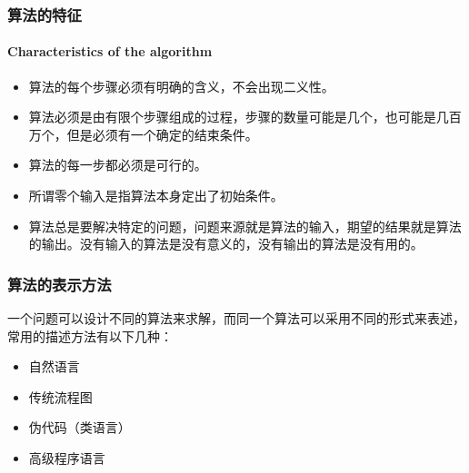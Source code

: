 \documentclass[dvipsnames, svgnames, x11names]{beamer}
\begin{document}
\begin{frame}
    \frametitle{算法的特征}
    \framesubtitle{Characteristics of the algorithm}
    \begin{itemize}
      \item {}
        
      算法的每个步骤必须有明确的含义，不会出现二义性。
      
      \item {}
      
      算法必须是由有限个步骤组成的过程，步骤的数量可能是几个，也可能是几百万个，但是必须有一个确定的结束条件。
      \item {}
      
      算法的每一步都必须是可行的。
      
      \item {}
      
      所谓零个输入是指算法本身定出了初始条件。
      
      \item {}
      
      算法总是要解决特定的问题，问题来源就是算法的输入，期望的结果就是算法的输出。没有输入的算法是没有意义的，没有输出的算法是没有用的。
      
    \end{itemize}

\end{frame}


\begin{frame}
    \frametitle{算法的表示方法}
    一个问题可以设计不同的算法来求解，而同一个算法可以采用不同的形式来表述，常用的描述方法有以下几种：
    \begin{itemize}
      \item 自然语言
      \item 传统流程图
      \item 伪代码（类语言）
      \item 高级程序语言
    \end{itemize}
\end{frame}
\end{document}
